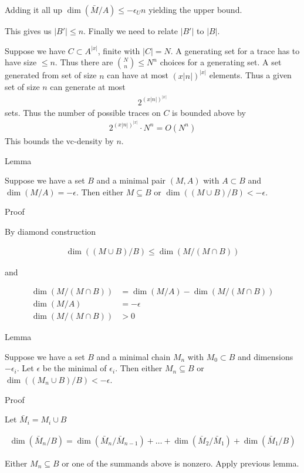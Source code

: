 \documentclass{amsart}
\begin{document}
Adding it all up $\dim(\bar M / A) \leq -\epsilon_U n$ yielding the upper bound.

This gives us $|B'| \leq n$.
Finally we need to relate $|B'|$ to $|B|$.

Suppose we have $C \subset A^{|x|}$, finite with $|C| = N$.
A generating set for a trace has to have size $\leq n$.
Thus there are ${N \choose n} \leq N^n$ choices for a generating set.
A set generated from set of size $n$ can have at most $(x|n|)^{|x|}$ elements.
Thus a given set of size $n$ can generate at most
\begin{align*}
	2^{(x|n|)^{|x|}}
\end{align*}
sets.
Thus the number of possible traces on $C$ is bounded above by
\begin{align*}
  2^{(x|n|)^{|x|}} \cdot N^n = O(N^n)
\end{align*}
This bounds the vc-density by $n$.

Lemma

Suppose we have a set $B$ and a minimal pair $(M, A)$ with $A \subset B$ and $\dim(M/A) = -\epsilon$.
Then either $M \subseteq B$ or $\dim((M \cup B)/B) < -\epsilon$.

Proof

By diamond construction

\begin{align*}
	\dim((M \cup B)/B) \leq \dim(M / (M \cap B))
\end{align*}

and 

\begin{align*}
	\dim(M / (M \cap B)) &= \dim (M/A) - \dim(M / (M \cap B)) \\
	\dim (M/A) &= -\epsilon \\
	\dim(M / (M \cap B)) &> 0
\end{align*}


Lemma

Suppose we have a set $B$ and a minimal chain $M_n$ with $M_0 \subset B$ and dimensions $-\epsilon_i$.
Let $\epsilon$ be the minimal of $\epsilon_i$.
Then either $M_n \subseteq B$ or $\dim((M_n \cup B)/B) < -\epsilon$.

Proof

Let $\bar M_i = M_i \cup B$

\begin{align*}
	\dim(\bar M_n/B) = \dim(\bar M_n/\bar M_{n-1}) + \ldots + \dim(\bar M_2/\bar M_1) + \dim(\bar M_1/B)
\end{align*}

Either $M_n \subseteq B$ or one of the summands above is nonzero.
Apply previous lemma.
\end{document}
